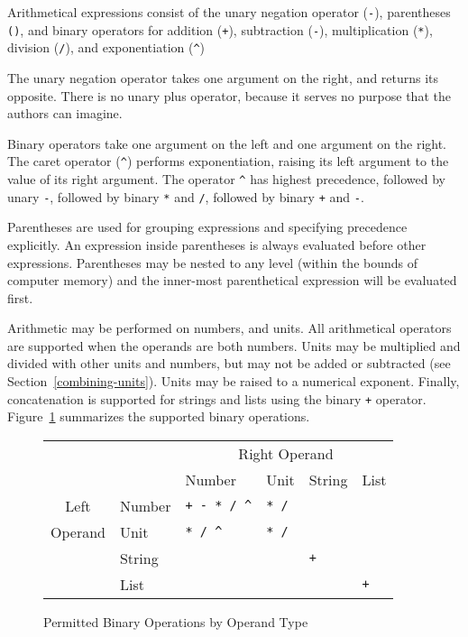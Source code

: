 Arithmetical expressions consist of the unary negation operator
(\verb|-|), parentheses \verb|()|, and binary operators for addition
(\verb|+|), subtraction (\verb|-|), multiplication (\verb|*|),
division (\verb|/|), and exponentiation (\verb|^|)

The unary negation operator takes one argument on the right, and
returns its opposite.  There is no unary plus operator, because it
serves no purpose that the authors can imagine.

Binary operators take one argument on the left and one argument on the
right. The caret operator (\verb|^|) performs exponentiation, raising
its left argument to the value of its right argument. The operator
\verb|^| has highest precedence, followed by unary \verb|-|, followed
by binary \verb|*| and \verb|/|, followed by binary \verb|+| and
\verb|-|.

Parentheses are used for grouping expressions and specifying
precedence explicitly.  An expression inside parentheses is always
evaluated before other expressions.  Parentheses may be nested to any
level (within the bounds of computer memory) and the inner-most
parenthetical expression will be evaluated first.

Arithmetic may be performed on numbers, and units.  All arithmetical
operators are supported when the operands are both numbers.  Units may
be multiplied and divided with other units and numbers, but may not be
added or subtracted (see Section~\ref{combining-units}).  Units may be
raised to a numerical exponent.  Finally, concatenation is supported
for strings and lists using the binary \verb|+| operator.
Figure~\ref{binops} summarizes the supported binary operations.

\begin{figure}
\centering%
\begin{tabular}{|cl|l|l|l|l|} \hline
        &         & \multicolumn{4}{c|}{Right Operand} \\
        &         & Number            & Unit             & String           & List \\
\hline
Left    & Number  & \verb|+ - * / ^|  & \verb|* /|       &                  &                  \\
Operand & Unit    & \verb|* / ^|      & \verb|* /|       &                  &                  \\
        & String  &                   &                  & \verb|+|         &                  \\
        & List    &                   &                  &                  & \verb|+|         \\
\hline
\end{tabular}
\caption{Permitted Binary Operations by Operand Type}
\label{binops}
\end{figure}

